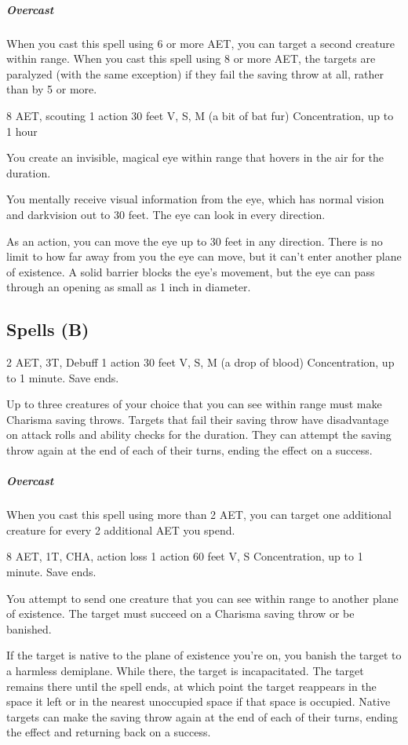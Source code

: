 \subparagraph*{Overcast} When you cast this spell using 6 or more AET, you can target a second creature within range. When you cast this spell using 8 or more AET, the targets are paralyzed (with the same exception) if they fail the saving throw at all, rather than by 5 or more.


{8 AET, scouting}
{1 action}
{30 feet}
{V, S, M (a bit of bat fur)}
{Concentration, up to 1 hour}

You create an invisible, magical eye within range that hovers in the air for the duration.

You mentally receive visual information from the eye, which has normal vision and darkvision out to 30 feet. The eye can look in every direction.

As an action, you can move the eye up to 30 feet in any direction. There is no limit to how far away from you the eye can move, but it can't enter another plane of existence. A solid barrier blocks the eye's movement, but the eye can pass through an opening as small as 1 inch in diameter.

\subsection{Spells (B)}

{2 AET, 3T, Debuff}
{1 action}
{30 feet}
{V, S, M (a drop of blood)}
{Concentration, up to 1 minute. Save ends.}

Up to three creatures of your choice that you can see within range must make Charisma saving throws. Targets that fail their saving throw have disadvantage on attack rolls and ability checks for the duration. They can attempt the saving throw again at the end of each of their turns, ending the effect on a success.

\subparagraph*{Overcast} When you cast this spell using more than 2 AET, you can target one additional creature for every 2 additional AET you spend.


{8 AET, 1T, CHA, action loss}
{1 action}
{60 feet}
{V, S}
{Concentration, up to 1 minute. Save ends.}

You attempt to send one creature that you can see within range to another plane of existence. The target must succeed on a Charisma saving throw or be banished.

If the target is native to the plane of existence you're on, you banish the target to a harmless demiplane. While there, the target is incapacitated. The target remains there until the spell ends, at which point the target reappears in the space it left or in the nearest unoccupied space if that space is occupied. Native targets can make the saving throw again at the end of each of their turns, ending the effect and returning back on a success.

